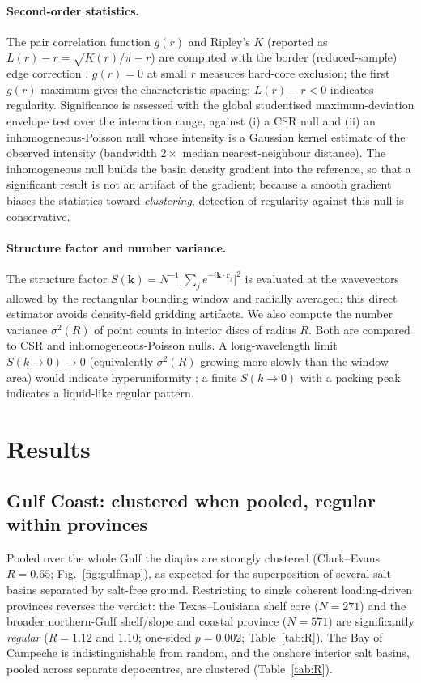 \documentclass[11pt]{article}
\begin{document}
\paragraph{Second-order statistics.}
The pair correlation function $g(r)$ and Ripley's $K$ (reported as $L(r)-r=\sqrt{K(r)/\pi}-r$) are computed
with the border (reduced-sample) edge correction \citep{ripley1977,baddeley2015}. $g(r)=0$ at small $r$
measures hard-core exclusion; the first $g(r)$ maximum gives the characteristic spacing; $L(r)-r<0$
indicates regularity. Significance is assessed with the global studentised maximum-deviation envelope test
\citep{myllymaki2017} over the interaction range, against (i) a CSR null and (ii) an inhomogeneous-Poisson
null whose intensity is a Gaussian kernel estimate of the observed intensity (bandwidth $2\times$ median
nearest-neighbour distance). The inhomogeneous null builds the basin density gradient into the reference, so
that a significant result is not an artifact of the gradient; because a smooth gradient biases the
statistics toward \emph{clustering}, detection of regularity against this null is conservative.

\paragraph{Structure factor and number variance.}
The structure factor $S(\mathbf k)=N^{-1}\big|\sum_j e^{-i\mathbf k\cdot\mathbf r_j}\big|^2$ is evaluated at
the wavevectors allowed by the rectangular bounding window and radially averaged; this direct estimator
avoids density-field gridding artifacts. We also compute the number variance $\sigma^2(R)$ of point counts
in interior discs of radius $R$. Both are compared to CSR and inhomogeneous-Poisson nulls. A long-wavelength
limit $S(k\!\to\!0)\to0$ (equivalently $\sigma^2(R)$ growing more slowly than the window area) would indicate
hyperuniformity \citep{torquato2018}; a finite $S(k\!\to\!0)$ with a packing peak indicates a liquid-like
regular pattern.

\section{Results}

\subsection{Gulf Coast: clustered when pooled, regular within provinces}
Pooled over the whole Gulf the diapirs are strongly clustered (Clark--Evans $R=0.65$; Fig.~\ref{fig:gulfmap}),
as expected for the superposition of several salt basins separated by salt-free ground. Restricting to single
coherent loading-driven provinces reverses the verdict: the Texas--Louisiana shelf core ($N=271$) and the
broader northern-Gulf shelf/slope and coastal province ($N=571$) are significantly \emph{regular}
($R=1.12$ and $1.10$; one-sided $p=0.002$; Table~\ref{tab:R}). The Bay of Campeche is indistinguishable from
random, and the onshore interior salt basins, pooled across separate depocentres, are clustered
(Table~\ref{tab:R}).
\end{document}
